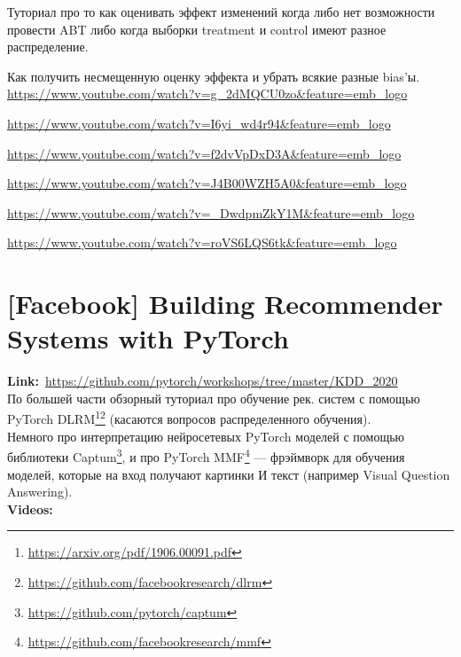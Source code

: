 Туториал про то как оценивать эффект изменений когда либо нет возможности провести ABT либо когда выборки treatment и control имеют разное распределение.

Как получить несмещенную оценку эффекта и убрать всякие разные bias'ы. \\

\url{https://www.youtube.com/watch?v=g_2dMQCU0zo&feature=emb_logo}

\url{https://www.youtube.com/watch?v=I6yi_wd4r94&feature=emb_logo}

\url{https://www.youtube.com/watch?v=f2dvVpDxD3A&feature=emb_logo}

\url{https://www.youtube.com/watch?v=J4B00WZH5A0&feature=emb_logo}

\url{https://www.youtube.com/watch?v=_DwdpmZkY1M&feature=emb_logo}

\url{https://www.youtube.com/watch?v=roVS6LQS6tk&feature=emb_logo}


\newpage
\section*{[Facebook] Building Recommender Systems with PyTorch} 

\textbf{Link:}~\url{https://github.com/pytorch/workshops/tree/master/KDD_2020} \\

По большей части обзорный туториал про обучение рек. систем с помощью PyTorch DLRM\footnote{\url{https://arxiv.org/pdf/1906.00091.pdf}}\footnote{\url{https://github.com/facebookresearch/dlrm}} (касаются вопросов распределенного обучения). \\

Немного про интерпретацию нейросетевых PyTorch моделей с помощью библиотеки Captum\footnote{\url{https://github.com/pytorch/captum}}, и про PyTorch MMF\footnote{\url{https://github.com/facebookresearch/mmf}} --- фрэймворк для обучения моделей, которые на вход получают картинки И текст (например Visual Question Answering).  \\

\textbf{Videos:}

